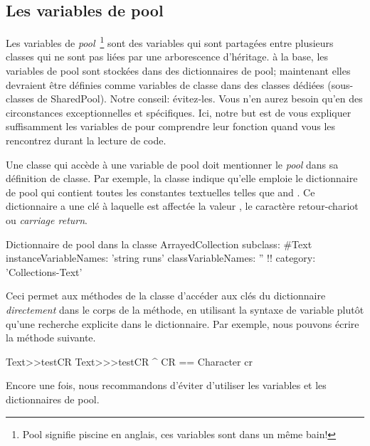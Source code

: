 \documentclass[a4paper,10pt,twoside]{book}
\begin{document}
\subsection{Les variables de pool}
Les variables de \emph{pool}~\footnote{Pool signifie piscine en anglais, ces variables sont dans un même bain!} sont des variables qui sont partagées entre plusieurs classes qui ne sont pas liées par une arborescence d'héritage.
à la base, les variables de pool sont stockées dans des dictionnaires
de pool;  maintenant elles devraient être définies comme variables
de classe dans des classes dédiées (sous-classes de SharedPool).
Notre conseil: évitez-les. Vous n'en aurez besoin qu'en des circonstances
exceptionnelles et spécifiques.
Ici, notre but est de vous expliquer suffisamment les variables de
 pour comprendre leur fonction quand vous les
rencontrez durant la lecture de code.

Une classe qui accède à une variable de pool doit mentionner le \emph{pool}
dans sa définition de classe.
Par exemple, la classe  indique qu'elle emploie le dictionnaire
de pool  qui contient toutes les constantes textuelles
telles que 
 and . 
Ce dictionnaire a une clé  à laquelle est affectée la valeur
, \ie le caractère retour-chariot ou \emph{carriage return}.

\begin{classdef}[textpooldict]{Dictionnaire de pool dans la classe }
ArrayedCollection subclass: #Text
        instanceVariableNames: 'string runs' 	
        classVariableNames: '' 	
        !!
        category: 'Collections-Text'
\end{classdef}
   
Ceci permet aux méthodes de la classe  d'accéder aux clés
du dictionnaire \emph{directement} dans le corps de la méthode, \ie 
en utilisant la syntaxe de variable plutôt qu'une recherche explicite
dans le dictionnaire.
Par exemple, nous pouvons écrire la méthode suivante.
  
\begin{method}[texttestcr]{Text>>testCR}
Text>>>testCR 	
      ^ CR == Character cr
\end{method}

Encore une fois, nous recommandons d'éviter d'utiliser
les variables et les dictionnaires de pool.
\end{document}
